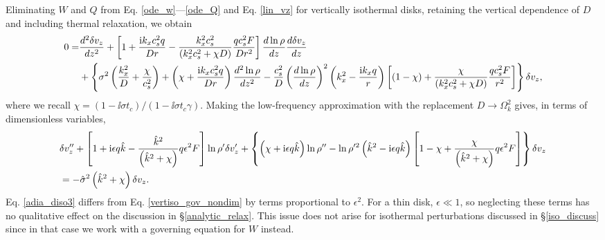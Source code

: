 Eliminating $W$ and $Q$ from Eq. \ref{ode_w}---\ref{ode_Q} and
 Eq. \ref{lin_vz} for vertically isothermal disks, retaining the
 vertical dependence of $D$ and including thermal relaxation, we
 obtain 
\begin{align}
  0 =& \frac{d^2\delta v_z}{dz^2} + \left[1 + \frac{\mathrm{i} k_x c_s^2
      q}{Dr} - \frac{k_x^2c_s^2}{\left(k_x^2c_s^2 + \chi
        D\right)}\frac{qc_s^2F}{Dr^2}\right]\frac{d\ln\rho}{dz}\frac{d\delta
    v_z}{dz} \notag\\
  &+ \left\{\sigma^2\left(\frac{k_x^2}{D} +
      \frac{\chi}{c_s^2}\right) + \left(\chi + \frac{\mathrm{i} k_x c_s^2
        q}{Dr}\right)\frac{d^2\ln\rho}{dz^2} -
    \frac{c_s^2}{D}\left(\frac{d\ln\rho}{dz}\right)^2\left(k_x^2 -
      \frac{\mathrm{i} k_x q}{r}\right)
   \left[\left(1-\chi\right) +
     \frac{\chi}{\left(k_x^2c_s^2 + \chi D\right)}\frac{qc_s^2 F}{r^2}\right] 
   \right\}\delta v_z,
\end{align}
where we recall $\chi = \left(1-\ii\sigma t_c\right)/\left(1-\ii\sigma
t_c \gamma\right)$. Making the low-frequency approximation with the
replacement $D\to \Omega_k^2$ gives, in terms of dimensionless
variables,
\begin{align}
   &\delta v_z ^{\prime\prime} + \left[1 + \mathrm{i}\epsilon q\hat{k} -
    \frac{ \hat{k}^2}{
      \left(\hat{k}^2+\chi\right)}q \epsilon^2F\right]\ln\rho^{\prime}\delta v_z^\prime +
  \left\{\left(\chi + \mathrm{i} \epsilon q
      \hat{k}\right)\ln\rho^{\prime\prime} - \ln\rho^{\prime
      2}\left(\hat{k}^2 -
      \mathrm{i}\epsilon
      q\hat{k}\right)\left[1 - \chi +
      \frac{\chi}{\left(\hat{k}^2+\chi\right)}q\epsilon^2F\right]\right\}\delta v_z \notag\\&=
  -\hat{\sigma}^2\left(\hat{k}^2+\chi\right)\delta v_z\label{adia_diso3}.
\end{align}   
Eq. \ref{adia_diso3} differs from Eq. \ref{vertiso_gov_nondim} by terms
proportional to $\epsilon^2$. For a thin disk, $\epsilon\ll1$, so
neglecting these terms has no qualitative effect on the discussion in 
\S\ref{analytic_relax}.  This issue does not
arise for isothermal perturbations discussed in \S\ref{iso_discuss}
since in that case we work with a governing equation for $W$ instead. 

